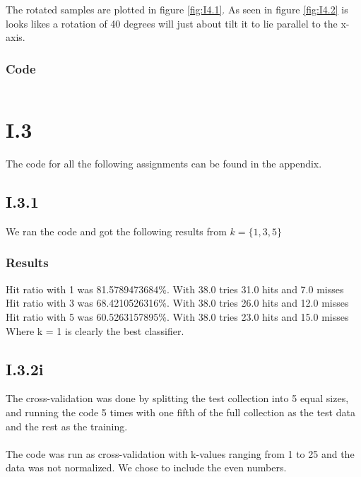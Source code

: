 \documentclass{article}
\begin{document}
The rotated samples are plotted in figure \ref{fig:I4.1}. As seen in
figure \ref{fig:I4.2} is looks likes a rotation of 40 degrees will just
about tilt it to lie parallel to the x-axis.



\subsubsection{Code}

\inputminted{matlab}{part1/i24john.m}


\section{I.3}

The code for all the following assignments can be found in the appendix.

\subsection{I.3.1}
We ran the code and got the following results from $k = \{1,3,5\}$\\
\subsubsection*{Results}
Hit ratio with 1 was {\color{green}81.5789473684\%}. With 38.0 tries 31.0 hits and 7.0 misses\\
Hit ratio with 3 was {\color{yellow}68.4210526316\%}. With 38.0 tries 26.0 hits and 12.0 misses\\
Hit ratio with 5 was {\color{yellow}60.5263157895\%}. With 38.0 tries 23.0 hits and 15.0 misses\\
Where k = 1 is clearly the best classifier.\\

\subsection{I.3.2i}

The cross-validation was done by splitting the test collection into
5 equal sizes, and running the code 5 times with one fifth of the full
collection as the test data and the rest as the training.\\\\ The code
was run as cross-validation with k-values ranging from 1 to 25 and the
data was not normalized. We chose to include the even numbers.
\end{document}
